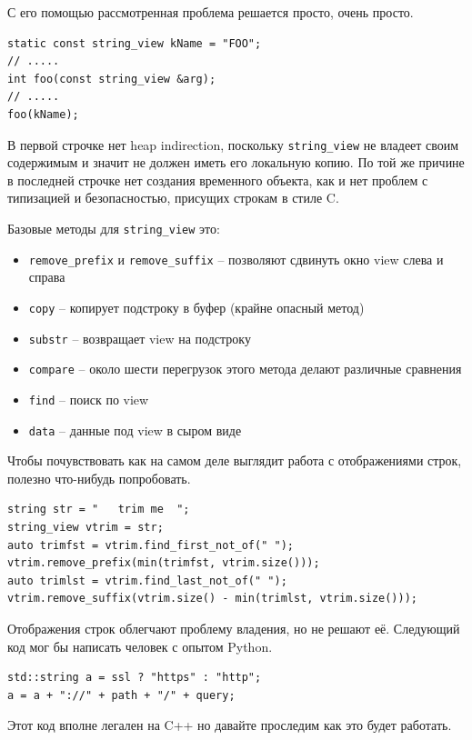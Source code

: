 \documentclass[a4paper,12pt,oneside]{article}
\begin{document}
С его помощью рассмотренная проблема решается просто, очень просто.

\begin{lstlisting}
static const string_view kName = "FOO";
// .....
int foo(const string_view &arg);
// .....
foo(kName);
\end{lstlisting}

В первой строчке нет heap indirection, поскольку \lstinline!string_view! не владеет своим содержимым и значит не должен иметь его локальную копию. По той же причине в последней строчке нет создания временного объекта, как и нет проблем с типизацией и безопасностью, присущих строкам в стиле C.

Базовые методы для \lstinline!string_view! это:

\begin{itemize}
\item \lstinline!remove_prefix! и \lstinline!remove_suffix! -- позволяют сдвинуть окно view слева и справа
\item \lstinline!copy! -- копирует подстроку в буфер (крайне опасный метод)
\item \lstinline!substr! -- возвращает view на подстроку
\item \lstinline!compare! -- около шести перегрузок этого метода делают различные сравнения
\item \lstinline!find! -- поиск по view
\item \lstinline!data! -- данные под view в сыром виде
\end{itemize}

Чтобы почувствовать как на самом деле выглядит работа с отображениями строк, полезно что-нибудь попробовать.

\begin{lstlisting}
string str = "   trim me  ";
string_view vtrim = str;
auto trimfst = vtrim.find_first_not_of(" ");
vtrim.remove_prefix(min(trimfst, vtrim.size()));
auto trimlst = vtrim.find_last_not_of(" ");
vtrim.remove_suffix(vtrim.size() - min(trimlst, vtrim.size()));
\end{lstlisting}

Отображения строк облегчают проблему владения, но не решают её. Следующий код мог бы написать человек с опытом Python.

\begin{lstlisting}
std::string a = ssl ? "https" : "http";
a = a + "://" + path + "/" + query;
\end{lstlisting}

Этот код вполне легален на C++ но давайте проследим как это будет работать.
\end{document}
